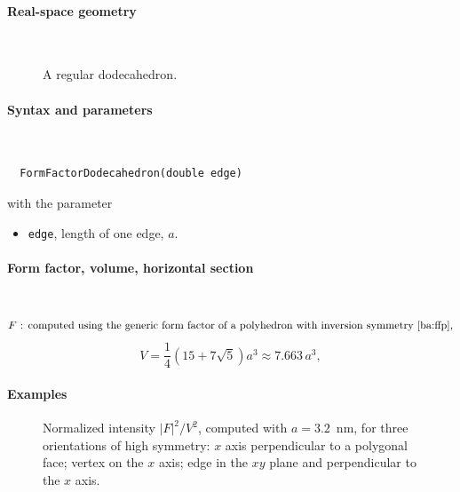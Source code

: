 \paragraph{Real-space geometry}\strut\\

\begin{figure}[H]
\strut\hfill
{}
\hfill\strut
\caption{A regular dodecahedron.}
\end{figure}

\FloatBarrier

\paragraph{Syntax and parameters}\strut\\[-2ex plus .2ex minus .2ex]
\begin{lstlisting}
  FormFactorDodecahedron(double edge)
\end{lstlisting}
with the parameter
\begin{itemize}
\item \texttt{edge}, length of one edge, $a$.
\end{itemize}

\paragraph{Form factor, volume, horizontal section}\strut\\
\begin{equation*}
  F \text{~: computed using the generic form factor of a polyhedron
             with inversion symmetry~\cite{ba:ffp},}
\end{equation*}
\begin{equation*}
  V= \frac{1}{4} (15+7\sqrt{5}) a^3 \approx 7.663\,a^3,
\end{equation*}

\paragraph{Examples}\strut

\begin{figure}[H]
\begin{center}
\end{center}
\caption{Normalized intensity $|F|^2/V^2$,
computed with $a=3.2$~nm,
for three orientations of high symmetry:
$x$ axis perpendicular to a polygonal face;
vertex on the $x$ axis;
edge in the $xy$ plane and perpendicular to the $x$ axis.}
\end{figure}

